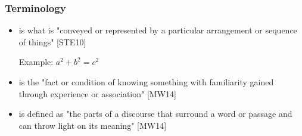 \begin{frame}
  \frametitle{Terminology}
  \begin{module}[id=terminology]

  \begin{itemize}
  \item \begin{definition}  is what is "conveyed or represented by a particular arrangement or sequence of things" [STE10]\end{definition}
   Example: \textit{$a^2 + b^2 = c^2$}
  \item \begin{definition}  is the "fact or condition of knowing something with familiarity gained through experience or association" [MW14] \end{definition}
  \item \begin{definition}  is defined as "the parts of a discourse that surround a word or passage and can throw light on its meaning" [MW14]\end{definition}
  \end{itemize}
  \end{module}
\end{frame}
